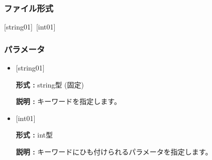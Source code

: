 \subsubsection{ファイル形式}
[string01]~[int01]
\subsubsection{パラメータ}
 \begin{itemize}
   \item  $[$string01$]$
   
   {\bf 形式 :} string型 (固定)
   
   {\bf 説明 :} キーワードを指定します。
   
   \item  $[$int01$]$
   
    {\bf 形式 :} int型 

   {\bf 説明 :} キーワードにひも付けられるパラメータを指定します。\\

   
  \end{itemize}

